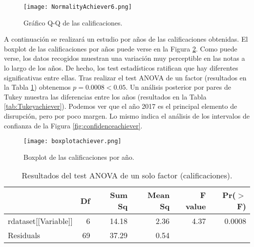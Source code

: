 \begin{figure}[H]
    \centering
    \texttt{[image: NormalityAchiever6.png]}
    \caption{Gráfico Q-Q de las calificaciones.}
    \label{fig:q-qsessionsachiever}
\end{figure}

A continuación se realizará un estudio por años de las calificaciones obtenidas. El boxplot de las calificaciones por años puede verse en la Figura \ref{fig:boxplotachieveryear}. Como puede verse, los datos recogidos muestran una variación muy perceptible en las notas a lo largo de los años. De hecho, los test estadísticos ratifican que hay diferentes significativas entre ellas. Tras realizar el test ANOVA de un factor (resultados en la Tabla \ref{tab:ANOVAachiever}) obtenemos $p = 0.0008 < 0.05$. Un análisis posterior por pares de Tukey muestra las diferencias entre los años (resultados en la Tabla \ref{tab:Tukeyachiever}). Podemos ver que el año 2017 es el principal elemento de disrupción, pero por poco margen. Lo mismo indica el análisis de los intervalos de confianza de la Figura \ref{fig:confidenceachiever}.

\begin{figure}[H]
    \centering
    \texttt{[image: boxplotachiever.png]}
    \caption{Boxplot de las calificaciones por año.}
    \label{fig:boxplotachieveryear}
\end{figure}

\begin{table}[H]
\centering
\caption{Resultados del test ANOVA de un solo factor (calificaciones).}
\label{tab:ANOVAachiever}
\centering
\begin{tabular}{lrrrrr}
  \hline
 & Df & Sum Sq & Mean Sq & F value & Pr($>$F) \\ 
  \hline
rdataset[[Variable]] & 6 & 14.18 & 2.36 & 4.37 & 0.0008 \\ 
  Residuals            & 69 & 37.29 & 0.54 &  &  \\ 
   \hline
\end{tabular}
\end{table}

